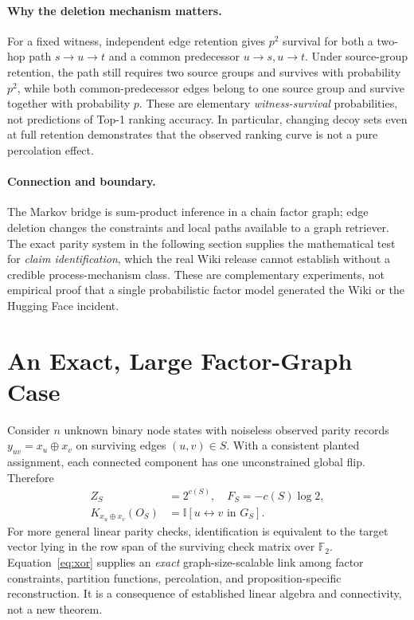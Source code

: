 \documentclass[10pt,twocolumn]{article}
\newcommand{\ind}{\mathbb{I}}
\begin{document}
\paragraph{Why the deletion mechanism matters.} For a fixed witness, independent edge retention gives $p^2$ survival for both a two-hop path $s\!\to\!u\!\to\!t$ and a common predecessor $u\!\to\!s,u\!\to\!t$. Under source-group retention, the path still requires two source groups and survives with probability $p^2$, while both common-predecessor edges belong to one source group and survive together with probability $p$. These are elementary \emph{witness-survival} probabilities, not predictions of Top-1 ranking accuracy. In particular, changing decoy sets even at full retention demonstrates that the observed ranking curve is not a pure percolation effect.

\paragraph{Connection and boundary.} The Markov bridge is sum-product inference in a chain factor graph; edge deletion changes the constraints and local paths available to a graph retriever. The exact parity system in the following section supplies the mathematical test for \emph{claim identification}, which the real Wiki release cannot establish without a credible process-mechanism class. These are complementary experiments, not empirical proof that a single probabilistic factor model generated the Wiki or the Hugging Face incident.

\section{An Exact, Large Factor-Graph Case}
Consider $n$ unknown binary node states with noiseless observed parity records
$y_{uv}=x_u\oplus x_v$ on surviving edges $(u,v)\in S$. With a consistent planted assignment, each connected component has one unconstrained global flip. Therefore
\begin{equation}
\begin{aligned}
Z_S&=2^{c(S)},\quad F_S=-c(S)\log 2,\\
K_{x_u\oplus x_v}(O_S)&=\ind[u\leftrightarrow v\text{ in }G_S].
\end{aligned}
\label{eq:xor}
\end{equation}
For more general linear parity checks, identification is equivalent to the target vector lying in the row span of the surviving check matrix over $\mathbb F_2$. Equation~\eqref{eq:xor} supplies an \emph{exact} graph-size-scalable link among factor constraints, partition functions, percolation, and proposition-specific reconstruction. It is a consequence of established linear algebra and connectivity, not a new theorem.
\end{document}
